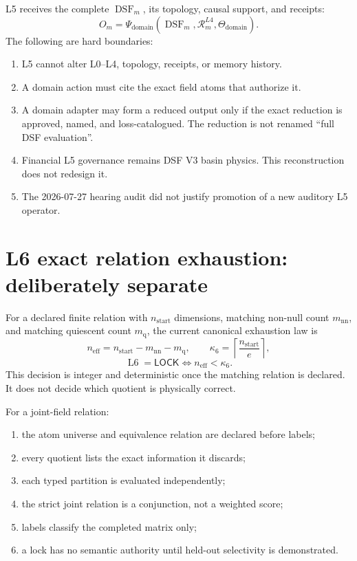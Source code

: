 \documentclass[11pt,oneside]{article}
\newcommand{\DSF}{\operatorname{DSF}}
\newcommand{\Lsix}{\operatorname{L6}}
\begin{document}
L5 receives the complete \(\DSF_m\), its topology, causal support, and
receipts:
\[
  O_m=\Psi_{\mathrm{domain}}
  \left(
    \DSF_m,\mathcal{R}^{L4}_m,\Theta_{\mathrm{domain}}
  \right).
\]
The following are hard boundaries:
\begin{enumerate}
  \item L5 cannot alter L0--L4, topology, receipts, or memory history.
  \item A domain action must cite the exact field atoms that authorize it.
  \item A domain adapter may form a reduced output only if the exact reduction
  is approved, named, and loss-catalogued. The reduction is not renamed
  ``full DSF evaluation''.
  \item Financial L5 governance remains DSF V3 basin physics. This
  reconstruction does not redesign it.
  \item The 2026-07-27 hearing audit did not justify promotion of a new
  auditory L5 operator.
\end{enumerate}

\section{L6 exact relation exhaustion: deliberately separate}

For a declared finite relation with \(n_{\mathrm{start}}\) dimensions,
matching non-null count \(m_{\mathrm{nn}}\), and matching quiescent count
\(m_{\mathrm{q}}\), the current canonical exhaustion law is
\[
  n_{\mathrm{eff}}
  =
  n_{\mathrm{start}}-m_{\mathrm{nn}}-m_{\mathrm{q}},
  \qquad
  \kappa_6=
  \left\lceil\frac{n_{\mathrm{start}}}{e}\right\rceil,
\]
\[
  \Lsix=\mathsf{LOCK}
  \iff
  n_{\mathrm{eff}}<\kappa_6.
\]
This decision is integer and deterministic once the matching relation is
declared. It does not decide which quotient is physically correct.

For a joint-field relation:
\begin{enumerate}
  \item the atom universe and equivalence relation are declared before labels;
  \item every quotient lists the exact information it discards;
  \item each typed partition is evaluated independently;
  \item the strict joint relation is a conjunction, not a weighted score;
  \item labels classify the completed matrix only;
  \item a lock has no semantic authority until held-out selectivity is
  demonstrated.
\end{enumerate}
\end{document}
